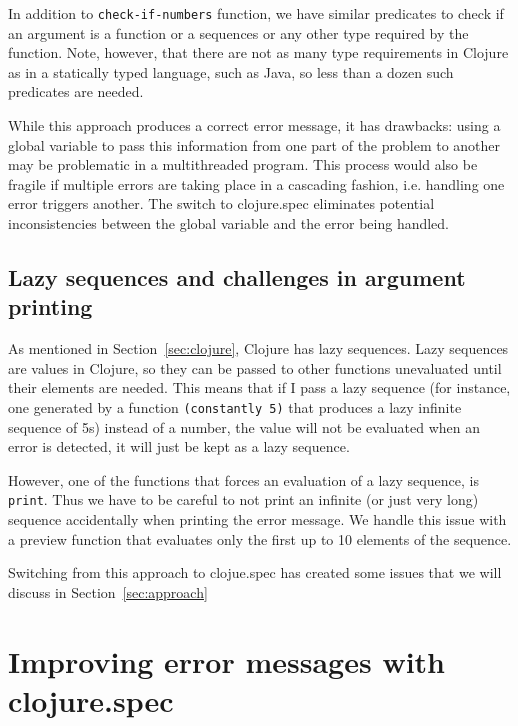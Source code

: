 \documentclass[12pt]{article}
\newcommand{\comment}[1]{{\bf \tt  {#1}}}
\newcommand{\tscomment}[1]{\textcolor{Teal}{\comment{Tony: {#1}}}}
\begin{document}
In addition to {\tt check-if-numbers} function, we have similar predicates to check if an argument is
a function or a sequences or any other type required by the function. Note, however, that there are
not as many type requirements in Clojure as in a statically typed language, such as Java, so less than  
a dozen such predicates are needed. 

While this approach produces a correct error message, it has drawbacks: using a global variable to
pass this information from one part of the problem to another may be problematic in a multithreaded 
program. This process would also be fragile if multiple errors are taking place in a cascading fashion,
i.e. handling one error triggers another. The switch to clojure.spec eliminates potential inconsistencies 
between the global variable and the error being handled. 

\subsection{Lazy sequences and challenges in argument printing}

As mentioned in Section~\ref{sec:clojure}, Clojure has lazy sequences. Lazy sequences are values in 
Clojure, so they can be passed to other functions unevaluated until their elements are needed. 
This means that if I pass a lazy sequence (for instance, one generated by a function {\tt (constantly 5)} that
produces a lazy infinite sequence of 5s) instead of a number, the value will not be evaluated when an 
error is detected, it will just be kept as a lazy sequence. 

However, 
one of the functions that forces an evaluation of  a lazy sequence, is {\tt print}. Thus we have to be careful to not print 
an infinite (or just very long) sequence accidentally when printing the error message. 
We handle this issue with a preview function that evaluates only the first up to 10 elements of the sequence.

Switching from this approach to clojue.spec has created some issues that we will discuss in Section~\ref{sec:approach}


\section{Improving error messages with clojure.spec}
\end{document}

